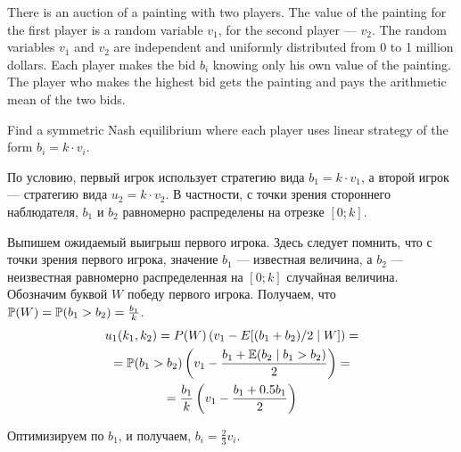 \begin{problem}
There is an auction of a painting with two players. The value of the painting for the first player is a random variable $v_1$, for the second player --- $v_2$. The random variables $v_1$ and $v_2$ are independent and uniformly distributed from 0 to 1 million dollars. Each player makes the bid $b_i$ knowing only his own value of the painting. The player who makes the highest bid gets the painting and pays the arithmetic mean of the two bids.

Find a symmetric Nash equilibrium where each player uses linear strategy of the form $b_i=k\cdot v_i$.


\begin{sol}
По условию, первый игрок использует стратегию вида $b_1=k\cdot v_1$, а второй игрок --- стратегию вида $u_2=k\cdot v_2$. В частности, с точки зрения стороннего наблюдателя, $b_1$ и $b_2$ равномерно распределены на отрезке $[0;k]$.

Выпишем ожидаемый выигрыш первого игрока. Здесь следует помнить, что с точки зрения первого игрока, значение $b_1$ --- известная величина, а $b_2$ --- неизвестная равномерно распределенная на $[0;k]$ случайная величина. Обозначим буквой $W$ победу первого игрока. Получаем, что $\P(W)=\P(b_1>b_2)=\frac{b_1}{k}$.
\begin{multline}
u_1(k_1,k_2)=P(W) \left( v_1 - E[(b_1+b_2)/2 \mid W] \right)=\\
=\P(b_1>b_2)\left(v_1- \frac{b_1+\E(b_2\mid b_1>b_2)}{2} \right) =\\
= \frac{b_1}{k} \left( v_1 - \frac{b_1+0.5b_1}{2}\right)
\end{multline}

Оптимизируем по $b_1$, и получаем,  $b_i=\frac{2}{3}v_i$.

\end{sol}
\end{problem}

